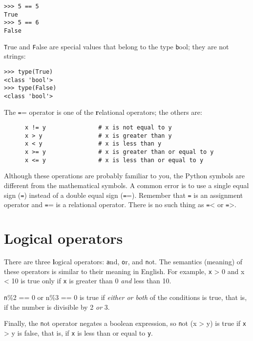 \documentclass[
DIV=11,
fontsize=12,
twoside,
headinclude=false,
titlepage=firstiscover,
abstract=true,
headsepline=true,
footsepline=true,
chapterprefix=true, %
headings=big,
bibliography=totoc,%
captions=tableheading
]{scrbook}
\theoremstyle{definition}
\begin{document}
\begin{lstlisting}
>>> 5 == 5
True
>>> 5 == 6
False
\end{lstlisting}
%
{\texttt True} and {\texttt False} are special
values that belong to the type {\texttt bool}; they are not strings:

\begin{lstlisting}
>>> type(True)
<class 'bool'>
>>> type(False)
<class 'bool'>
\end{lstlisting}
%
The {\texttt ==} operator is one of the {\textbf relational operators}; the
others are:

\begin{lstlisting}
      x != y               # x is not equal to y
      x > y                # x is greater than y
      x < y                # x is less than y
      x >= y               # x is greater than or equal to y
      x <= y               # x is less than or equal to y
\end{lstlisting}
%
Although these operations are probably familiar to you, the Python
symbols are different from the mathematical symbols.  A common error
is to use a single equal sign ({\texttt =}) instead of a double equal sign
({\texttt ==}).  Remember that {\texttt =} is an assignment operator and
{\texttt ==} is a relational operator.   There is no such thing as
{\texttt =<} or {\texttt =>}.


\section {Logical operators}

There are three {\textbf logical operators}: {\texttt and}, {\texttt
or}, and {\texttt not}.  The semantics (meaning) of these operators is
similar to their meaning in English.  For example,
{\texttt x > 0 and x < 10} is true only if {\texttt x} is greater than 0
{\em and} less than 10.

{\texttt n\%2 == 0 or n\%3 == 0} is true if {\em either or both} of the
conditions is true, that is, if the number is divisible by 2 {\em or}
3.

Finally, the {\texttt not} operator negates a boolean
expression, so {\texttt not (x > y)} is true if {\texttt x > y} is false,
that is, if {\texttt x} is less than or equal to {\texttt y}.
\end{document}
